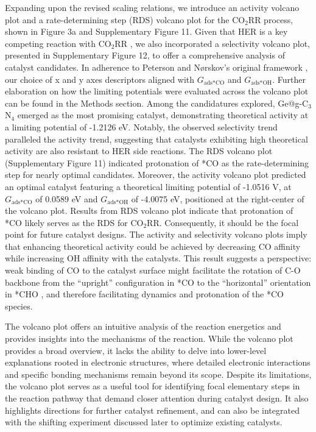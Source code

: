 Expanding upon the revised scaling relations, we introduce an activity volcano plot and a rate-determining step (RDS) volcano plot for the CO$_2$RR process, shown in Figure 3a and Supplementary Figure 11.
Given that HER is a key competing reaction with CO$_2$RR \cite{goyal2020competition}, we also incorporated a selectivity volcano plot, presented in Supplementary Figure 12, to offer a comprehensive analysis of catalyst candidates.
In adherence to Peterson and Nørskov's original framework \cite{peterson2012activity}, our choice of x and y axes descriptors aligned with $\textit{G}_{\text{ads} \ast \text{CO}}$ and $\textit{G}_{\text{ads} \ast \text{OH}}$.
Further elaboration on how the limiting potentials were evaluated across the volcano plot can be found in the Methods section.
Among the candidatures explored, Ge@g-C$_3$N$_4$ emerged as the most promising catalyst, demonstrating theoretical activity at a limiting potential of -1.2126 eV.
Notably, the observed selectivity trend paralleled the activity trend, suggesting that catalysts exhibiting high theoretical activity are also resistant to HER side reactions.
The RDS volcano plot (Supplementary Figure 11) indicated protonation of *CO as the rate-determining step for nearly optimal candidates.
Moreover, the activity volcano plot predicted an optimal catalyst featuring a theoretical limiting potential of -1.0516 V, at $\textit{G}_{\text{ads} \ast \text{CO}}$ of 0.0589 eV and $\textit{G}_{\text{ads} \ast \text{OH}}$ of -4.0075 eV, positioned at the right-center of the volcano plot.
Results from RDS volcano plot indicate that protonation of *CO likely serves as the RDS for CO$_2$RR.
Consequently, it should be the focal point for future catalyst designs.
The activity and selectivity volcano plots imply that enhancing theoretical activity could be achieved by decreasing CO affinity while increasing OH affinity with the catalysts.
This result suggests a perspective: weak binding of CO to the catalyst surface might facilitate the rotation of C-O backbone from the “upright” configuration in *CO to the “horizontal” orientation in *CHO \cite{peterson2010copper},
and therefore facilitating dynamics and protonation of the *CO species.

The volcano plot offers an intuitive analysis of the reaction energetics and provides insights into the mechanisms of the reaction.
While the volcano plot provides a broad overview, it lacks the ability to delve into lower-level explanations rooted in electronic structures, where detailed electronic interactions and specific bonding mechanisms remain beyond its scope.
Despite its limitations, the volcano plot serves as a useful tool for identifying focal elementary steps in the reaction pathway that demand closer attention during catalyst design.
It also highlights directions for further catalyst refinement, and can also be integrated with the shifting experiment discussed later to optimize existing catalysts.

